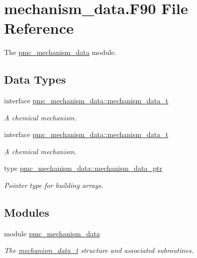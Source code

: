 \hypertarget{mechanism__data_8_f90}{}\section{mechanism\+\_\+data.\+F90 File Reference}
\label{mechanism__data_8_f90}


The \mbox{\hyperlink{namespacepmc__mechanism__data}{pmc\+\_\+mechanism\+\_\+data}} module.  


\subsection*{Data Types}
\begin{DoxyCompactItemize}
\item 
interface \mbox{\hyperlink{structpmc__mechanism__data_1_1mechanism__data__t}{pmc\+\_\+mechanism\+\_\+data\+::mechanism\+\_\+data\+\_\+t}}
\begin{DoxyCompactList}\small\item\em A chemical mechanism. \end{DoxyCompactList}\item 
interface \mbox{\hyperlink{structpmc__mechanism__data_1_1mechanism__data__t}{pmc\+\_\+mechanism\+\_\+data\+::mechanism\+\_\+data\+\_\+t}}
\begin{DoxyCompactList}\small\item\em A chemical mechanism. \end{DoxyCompactList}\item 
type \mbox{\hyperlink{structpmc__mechanism__data_1_1mechanism__data__ptr}{pmc\+\_\+mechanism\+\_\+data\+::mechanism\+\_\+data\+\_\+ptr}}
\begin{DoxyCompactList}\small\item\em Pointer type for building arrays. \end{DoxyCompactList}\end{DoxyCompactItemize}
\subsection*{Modules}
\begin{DoxyCompactItemize}
\item 
module \mbox{\hyperlink{namespacepmc__mechanism__data}{pmc\+\_\+mechanism\+\_\+data}}
\begin{DoxyCompactList}\small\item\em The \mbox{\hyperlink{structpmc__mechanism__data_1_1mechanism__data__t}{mechanism\+\_\+data\+\_\+t}} structure and associated subroutines. \end{DoxyCompactList}\end{DoxyCompactItemize}
